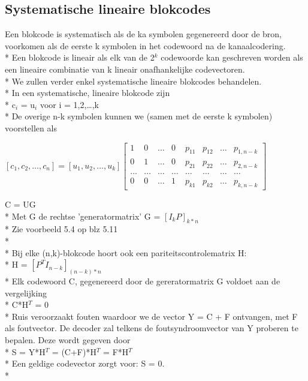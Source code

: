 \documentclass[10pt]{article}
\begin{document}
\subsection{Systematische lineaire blokcodes}
Een blokcode is systematisch als de ka symbolen gegenereerd door de bron, voorkomen als de eerste k symbolen in het codewoord na de kanaalcodering.\\*
Een blokcode is lineair als elk van de 2$^k$ codewoorde kan geschreven worden als een lineaire combinatie van k lineair onafhankelijke codevectoren.\\*
We zullen verder enkel systematische lineaire blokcodes behandelen.\\*
In een systematische, lineaire blokcode zijn\\*
c$_i$ = u$_i$ voor i = 1,2,\dots,k\\*
De overige n-k symbolen kunnen we (samen met de eerste k symbolen) voorstellen als
\begin{center}
$\left[c_1, c_2, \dots, c_n\right] = \left[u_1, u_2, \dots, u_k\right]\left[\begin{matrix} 
1 & 0 & \dots & 0 & p_{11} & p_{12} & \dots & p_{1, n-k}\\
0 & 1 & \dots & 0 & p_{21} & p_{22} & \dots & p_{2, n-k}\\
\dots & \dots & \dots & \dots & \dots & \dots & \dots & \dots\\
0 & 0 & \dots & 1 & p_{k1} & p_{k2} & \dots & p_{k, n-k}
\end{matrix}\right]$
\end{center}
C = UG\\*
Met G de rechtse 'generatormatrix' G = $\left[I_k P\right]_{k*n}$\\*
{\scriptsize Zie voorbeeld 5.4 op blz 5.11}\\*\\*
Bij elke (n,k)-blokcode hoort ook een pariteitscontrolematrix H:\\*
H = $\left[P^T I_{n-k}\right]_{(n-k)*n}$\\*
Elk codewoord C, gegenereerd door de gereratormatrix G voldoet aan de vergelijking\\*
C*H$^T$ = 0\\*
Ruis veroorzaakt fouten waardoor we de vector Y = C + F ontvangen, met F als foutvector. De decoder zal telkens de foutsyndroomvector van Y proberen te bepalen. Deze wordt gegeven door\\*
S = Y*H$^T$ = (C+F)*H$^T$ = F*H$^T$\\*
Een geldige codevector zorgt voor: S = 0.\\*
\end{document}
